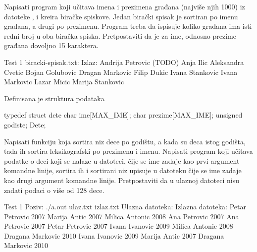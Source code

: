 \begin{Exercise}[label=506]
  Napisati program koji učitava imena i prezimena građana (najviše
  njih 1000) iz datoteke , i kreira biračke
  spiskove. Jedan birački spisak je sortiran po imenu građana, a drugi
  po prezimenu. Program treba da ispisuje koliko građana ima isti
  redni broj u oba biračka spiska. Pretpostaviti da je za ime, odnosno
  prezime građana dovoljno 15 karaktera.

\begin{miditest}
\begin{test}{Test 1}
biracki-spisak.txt:      Izlaz:
Andrija Petrovic         (TODO)
Anja Ilic
Aleksandra Cvetic
Bojan Golubovic
Dragan Markovic
Filip Dukic
Ivana Stankovic
Ivana Markovic
Lazar Micic
Marija Stankovic    
\end{test}
\end{miditest}
  
\end{Exercise}

\begin{Exercise}[label=508]
  Definisana je struktura podataka
\begin{ckod}
typedef struct dete
{
      char ime[MAX_IME];
      char prezime[MAX_IME];
      unsigned godiste;
} Dete;
\end{ckod}
Napisati funkciju koja sortira niz dece po godištu, a kada su deca
istog godišta, tada ih sortira leksikografski po prezimenu i
imenu. Napisati program koji učitava podatke o deci koji se nalaze u
datoteci, čije se ime zadaje kao prvi argument komandne linije,
sortira ih i sortirani niz upisuje u datoteku čije se ime zadaje kao
drugi argument komandne linije. Pretpostaviti da u ulaznoj datoteci
nisu zadati podaci o više od 128 dece.
  
\begin{maxitest}
\begin{test}{Test 1}
Poziv: ./a.out ulaz.txt izlaz.txt
Ulazna datoteka:                 Izlazna datoteka:
Petar Petrovic 2007              Marija Antic 2007
Milica Antonic 2008              Ana Petrovic 2007
Ana Petrovic 2007                Petar Petrovic 2007
Ivana Ivanovic 2009              Milica Antonic 2008
Dragana Markovic 2010            Ivana Ivanovic 2009
Marija Antic 2007                Dragana Markovic 2010
\end{test}
\end{maxitest}
  
\end{Exercise}

